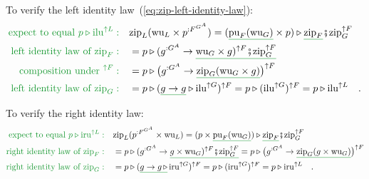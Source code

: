 To verify the left identity law~(\ref{eq:zip-left-identity-law}):
\begin{align*}
{\color{greenunder}\text{expect to equal }p\triangleright\text{ilu}^{\uparrow L}:}\quad & \text{zip}_{L}(\text{wu}_{L}\times p^{:F^{G^{A}}})=(\gunderline{\text{pu}_{F}(\text{wu}_{G})}\times p)\triangleright\gunderline{\text{zip}_{F}}\bef\text{zip}_{G}^{\uparrow F}\\
{\color{greenunder}\text{left identity law of }\text{zip}_{F}:}\quad & =p\triangleright(g^{:G^{A}}\rightarrow\gunderline{\text{wu}_{G}\times g)^{\uparrow F}\bef\text{zip}_{G}^{\uparrow F}}\\
{\color{greenunder}\text{composition under }^{\uparrow F}:}\quad & =p\triangleright\big(g^{:G^{A}}\rightarrow\gunderline{\text{zip}_{G}(\text{wu}_{G}\times g)}\big)^{\uparrow F}\\
{\color{greenunder}\text{left identity law of }\text{zip}_{G}:}\quad & =p\triangleright(\gunderline{g\rightarrow g}\triangleright\text{ilu}^{\uparrow G})^{\uparrow F}=p\triangleright(\text{ilu}^{\uparrow G})^{\uparrow F}=p\triangleright\text{ilu}^{\uparrow L}\quad.
\end{align*}

To verify the right identity law:
\begin{align*}
{\color{greenunder}\text{expect to equal }p\triangleright\text{iru}^{\uparrow L}:}\quad & \text{zip}_{L}(p^{:F^{G^{A}}}\times\text{wu}_{L})=(p\times\gunderline{\text{pu}_{F}(\text{wu}_{G})})\triangleright\gunderline{\text{zip}_{F}}\bef\text{zip}_{G}^{\uparrow F}\\
{\color{greenunder}\text{right identity law of }\text{zip}_{F}:}\quad & =p\triangleright(g^{:G^{A}}\rightarrow\gunderline{g\times\text{wu}_{G})^{\uparrow F}\bef\text{zip}_{G}^{\uparrow F}}=p\triangleright\big(g^{:G^{A}}\rightarrow\gunderline{\text{zip}_{G}(g\times\text{wu}_{G})}\big)^{\uparrow F}\\
{\color{greenunder}\text{right identity law of }\text{zip}_{G}:}\quad & =p\triangleright(\gunderline{g\rightarrow g\,\triangleright}\,\text{iru}^{\uparrow G})^{\uparrow F}=p\triangleright(\text{iru}^{\uparrow G})^{\uparrow F}=p\triangleright\text{iru}^{\uparrow L}\quad.
\end{align*}

